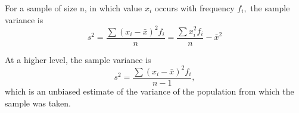  For a sample of size n, in which value $ x_i $ occurs with
frequency $ f_i , $ the sample variance is
\[ s^2 = \frac{\sum (x_i - \bar{x} ) ^2 f_i } {n}
 = \frac{\sum x_i ^2 f_i }{n} - \bar{x} ^2 \]
\par
At a higher level, the sample variance is 
\[ s^2 = \frac{\sum (x_i - \bar{x} ) ^2 f_i } {n-1} , \] which is an unbiased
estimate of the variance of the population from which the sample was taken.
